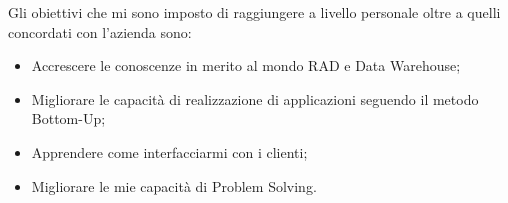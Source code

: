 Gli obiettivi che mi sono imposto di raggiungere a livello personale oltre a quelli concordati con l'azienda sono: 
\begin{itemize}
	\item Accrescere le conoscenze in merito al mondo RAD e Data Warehouse;
	\item Migliorare le capacità di realizzazione di applicazioni seguendo il metodo Bottom-Up;
	\item Apprendere come interfacciarmi con i clienti;
	\item Migliorare le mie capacità di Problem Solving.
\end{itemize}
